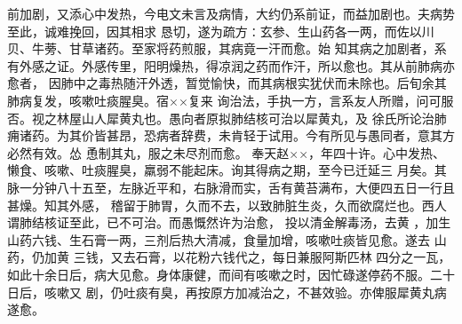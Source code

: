 \documentclass[a4paper,12pt,UTF8,twoside]{ctexbook}
\begin{document}
前加剧，又添心中发热，今电文未言及病情，大约仍系前证，而益加剧也。夫病势至此，诚难挽回，因其相求 
恳切，遂为疏方∶玄参、生山药各一两，而佐以川贝、牛蒡、甘草诸药。至家将药煎服，其病竟一汗而愈。始 
知其病之加剧者，系有外感之证。外感传里，阳明燥热，得凉润之药而作汗，所以愈也。其从前肺病亦愈者， 
因肺中之毒热随汗外透，暂觉愉快，而其病根实犹伏而未除也。后旬余其肺病复发，咳嗽吐痰腥臭。宿××复来 
询治法，手执一方，言系友人所赠，问可服否。视之林屋山人犀黄丸也。愚向者原拟肺结核可治以犀黄丸，及 
徐氏所论治肺痈诸药。为其价皆甚昂，恐病者辞费，未肯轻于试用。今有所见与愚同者，意其方必然有效。怂 
恿制其丸，服之未尽剂而愈。 
奉天赵××，年四十许。心中发热、懒食、咳嗽、吐痰腥臭，羸弱不能起床。询其得病之期，至今已迁延三 
月矣。其脉一分钟八十五至，左脉近平和，右脉滑而实，舌有黄苔满布，大便四五日一行且甚燥。知其外感， 
稽留于肺胃，久而不去，以致肺脏生炎，久而欲腐烂也。西人谓肺结核证至此，已不可治。而愚慨然许为治愈， 
投以清金解毒汤，去黄 ，加生山药六钱、生石膏一两，三剂后热大清减，食量加增，咳嗽吐痰皆见愈。遂去 
山药，仍加黄 三钱，又去石膏，以花粉六钱代之，每日兼服阿斯匹林 
四分之一瓦，如此十余日后，病大见愈。身体康健，而间有咳嗽之时，因忙碌遂停药不服。二十日后，咳嗽又 
剧，仍吐痰有臭，再按原方加减治之，不甚效验。亦俾服犀黄丸病遂愈。 
\end{document}
